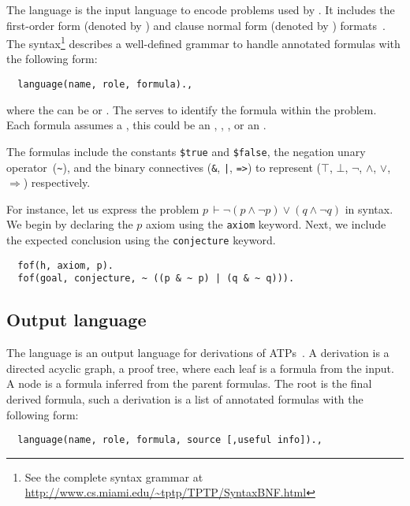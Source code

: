 \documentclass[../main.tex]{subfiles}
\begin{document}
The \TPTP language is the input language to encode problems used by \Metis.
It includes the first-order form (denoted by ) and clause normal form (denoted by ) formats~\cite{sutcliffe2009}.
The \TPTP syntax\footnote{See the complete syntax grammar
at \url{http://www.cs.miami.edu/~tptp/TPTP/SyntaxBNF.html}} describes a well-defined grammar to handle annotated
formulas with the following form:

\begin{verbatim}
  language(name, role, formula).,
\end{verbatim}

where the  can be  or . The
 serves to identify the formula within the problem. Each
formula assumes a , this could be an ,
, ,  or an
.

The formulas include the constants
\verb!$true! and \verb!$false!, the negation unary
operator~(\verb!~!), and the binary connectives
(\verb!&!, \verb!|!, \verb!=>!) to represent
($⊤$, $⊥$, $¬$, $∧$, $∨$, $⇒$) respectively.

\begin{myexamplenum}
  For instance, let us express the problem
  $p\, ⊢ ¬ (p ∧ ¬ p) ∨ (q ∧ ¬ q)$ in \TPTP syntax. We begin by
  declaring the $p$ axiom using the \verb!axiom!  keyword. Next, we
  include the expected conclusion using the \verb!conjecture! keyword.

\begin{verbatim}
  fof(h, axiom, p).
  fof(goal, conjecture, ~ ((p & ~ p) | (q & ~ q))).
\end{verbatim}

\end{myexamplenum}


\subsection{Output language}
\label{ssec:output-language}

The \TSTP language is an output language for derivations of
ATPs~\cite{Sutcliffe-Schulz-Claessen-VanGelder-2006}.
A \TSTP derivation is a directed acyclic graph, a proof tree,
where each leaf is a formula from the \TPTP input. A node is a formula
inferred from the parent formulas. The root is the final derived formula,
such a derivation is a list of annotated formulas with the following form:

\begin{verbatim}
  language(name, role, formula, source [,useful info]).,
\end{verbatim}
\end{document}
